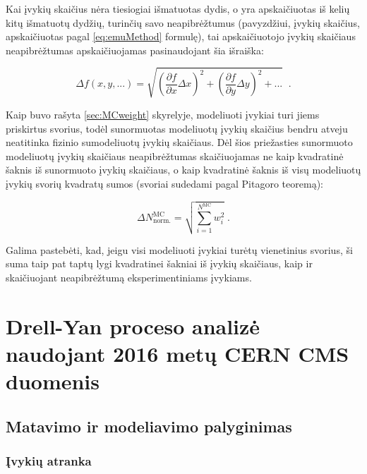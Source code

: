 \documentclass[a4paper, 12pt]{article}
\newlength\q
\begin{document}
Kai įvykių skaičius nėra tiesiogiai išmatuotas dydis, o yra apskaičiuotas iš kelių kitų išmatuotų dydžių, turinčių savo
neapibrėžtumus (pavyzdžiui, įvykių skaičius, apskaičiuotas pagal \eqref{eq:emuMethod} formulę), tai apskaičiuotojo įvykių
skaičiaus neapibrėžtumas apskaičiuojamas pasinaudojant šia išraiška:

\begin{equation}
	\Delta f(x, y, ...) =
	\sqrt{ \left( \frac{\partial f}{\partial x} \Delta x \right)^{2} +
	\left( \frac{\partial f}{\partial y} \Delta y \right)^{2} + ... } \;\; \mathrm{.}
	\label{eq:DerUnc}
\end{equation}

Kaip buvo rašyta \ref{sec:MCweight} skyrelyje, modeliuoti įvykiai turi jiems priskirtus svorius, todėl sunormuotas modeliuotų įvykių
skaičius bendru atveju neatitinka fizinio sumodeliuotų įvykių skaičiaus.
Dėl šios priežasties sunormuoto modeliuotų įvykių skaičiaus neapibrėžtumas skaičiuojamas ne kaip kvadratinė šaknis iš
sunormuoto įvykių skaičiaus, o kaip kvadratinė šaknis iš visų modeliuotų įvykių svorių kvadratų sumos (svoriai sudedami
pagal Pitagoro teoremą):

\begin{equation}
	\Delta N^{\mathrm{MC}}_{\mathrm{norm.}} = \sqrt{\sum_{i=1}^{N^{\mathrm{MC}}}w_{i}^{2}} \; .
	\label{eq:Sumw2Unc}
\end{equation}

Galima pastebėti, kad, jeigu visi modeliuoti įvykiai turėtų vienetinius svorius, ši suma taip pat taptų lygi kvadratinei
šakniai iš įvykių skaičiaus, kaip ir skaičiuojant neapibrėžtumą eksperimentiniams įvykiams.

\clearpage
\section{Drell-Yan proceso analizė naudojant 2016 metų CERN CMS duomenis}

\subsection{Matavimo ir modeliavimo palyginimas}

\subsubsection{Įvykių atranka}
\end{document}
